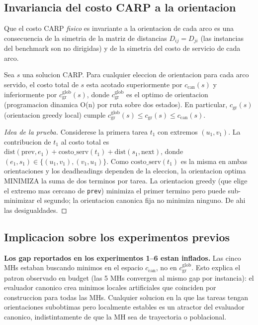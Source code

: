 \subsection{Invariancia del costo CARP a la orientacion}

Que el costo CARP \emph{fisico} es invariante a la orientacion de cada
arco es una consecuencia de la simetria de la matriz de distancias
$D_{ij} = D_{ji}$ (las instancias del benchmark son no dirigidas) y de
la simetria del costo de servicio de cada arco.

\begin{proposicion}
\label{prop:invariancia}
Sea $s$ una solucion CARP. Para cualquier eleccion de orientacion para
cada arco servido, el costo total de $s$ esta acotado superiormente por
$c_{\text{can}}(s)$ y inferiormente por $c_{\text{gr}}^{\text{glob}}(s)$,
donde $c_{\text{gr}}^{\text{glob}}$ es el optimo de orientacion
(programacion dinamica O(n) por ruta sobre dos estados). En particular,
$c_{\text{gr}}(s)$ (orientacion greedy local) cumple
$c_{\text{gr}}^{\text{glob}}(s) \le c_{\text{gr}}(s) \le c_{\text{can}}(s)$.
\end{proposicion}

\begin{proof}[Idea de la prueba]
Considerese la primera tarea $t_1$ con extremos $(u_1, v_1)$. La
contribucion de $t_1$ al costo total es $\mathrm{dist}(\text{prev}, e_1) +
\mathrm{costo\_serv}(t_1) + \mathrm{dist}(s_1, \text{next})$, donde
$(e_1, s_1) \in \{(u_1, v_1), (v_1, u_1)\}$. Como
$\mathrm{costo\_serv}(t_1)$ es la misma en ambas orientaciones y los
deadheadings dependen de la eleccion, la orientacion optima MINIMIZA la
suma de dos terminos por tarea. La orientacion greedy (que elige el
extremo mas cercano de \texttt{prev}) minimiza el primer termino pero
puede sub-minimizar el segundo; la orientacion canonica fija no
minimiza ninguno. De ahi las desigualdades.
\end{proof}

\subsection{Implicacion sobre los experimentos previos}

\textbf{Los gap reportados en los experimentos 1--6 estan inflados.}
Las cinco MHs estaban buscando minimos en el espacio
$c_{\text{can}}$, no en $c_{\text{gr}}^{\text{glob}}$. Esto explica el
patron observado en budget (las 5 MHs convergen al mismo gap por
instancia): el evaluador canonico crea minimos locales artificiales
que coinciden por construccion para todas las MHs. Cualquier solucion
en la que las tareas tengan orientaciones subobtimas pero localmente
estables es un atractor del evaluador canonico, indistintamente de
que la MH sea de trayectoria o poblacional.


